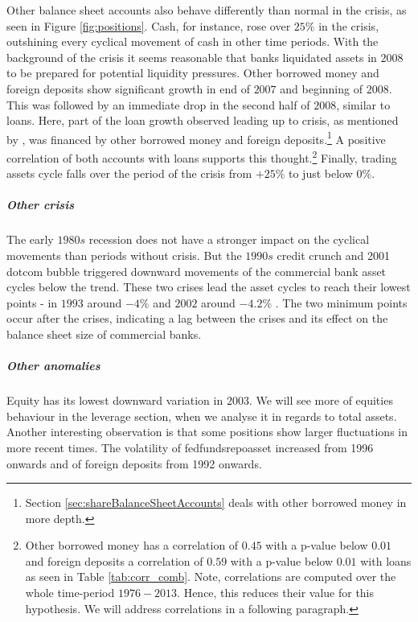 \documentclass[12pt, a4paper]{article} %
\begin{document}
Other balance sheet accounts also behave differently than normal in the crisis, as seen in Figure \ref{fig:positions}.
Cash, for instance, rose over $25\%$ in the crisis, outshining every cyclical movement of cash in other time periods. With the background of the crisis it seems reasonable that banks liquidated assets in $2008$ to be prepared for potential liquidity pressures. 
Other borrowed money and foreign deposits show significant growth in end of $2007$ and beginning of $2008$. This was followed by an immediate drop in the second half of $2008$, similar to loans. Here, part of the loan growth observed leading up to crisis, as mentioned by \cite{bassett2008profits}, was financed by other borrowed money and foreign deposits.\footnote{Section \ref{sec:shareBalanceSheetAccounts} deals with other borrowed money in more depth.} A positive correlation of both accounts with loans supports this thought.\footnote{Other borrowed money has a correlation of $0.45$ with a p-value below $0.01$ and foreign deposits a correlation of $0.59$ with a p-value below $0.01$ with loans as seen in Table \ref{tab:corr_comb}. Note, correlations are computed over the whole time-period $1976-2013$. Hence, this reduces their value for this hypothesis. We will address correlations in a following paragraph.} 
Finally, trading assets cycle falls over the period of the crisis from $+25\%$ to just below $0\%$.



\subparagraph{Other crisis}
The early $1980s$ recession does not have a stronger impact on the cyclical movements than periods without crisis. But the $1990s$ credit crunch and 2001 dotcom bubble triggered downward movements of the commercial bank asset cycles below the trend. These two crises lead the asset cycles to reach their lowest points - in $1993$ around $-4\%$ and $2002$ around $-4.2\%$ . The two minimum points occur after the crises, indicating a lag between the crises and its effect on the balance sheet size of commercial banks.

\subparagraph{Other anomalies}
Equity has its lowest downward variation in 2003. We will see more of equities behaviour in the leverage section, when we analyse it in regards to total assets.
Another interesting observation is that some positions show larger fluctuations in more recent times. The volatility of fedfundsrepoasset increased from 1996 onwards and of foreign deposits from 1992 onwards.
\end{document}
